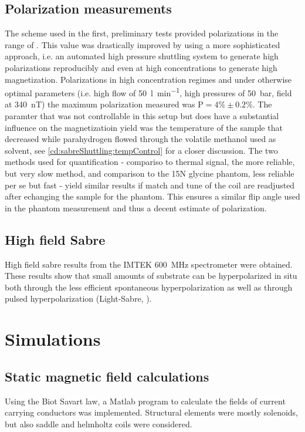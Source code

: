     \subsection{Polarization measurements}
        The scheme used in the first, preliminary tests provided polarizations in the range of . This value was drastically improved by using a more sophisticated approach, i.e. an automated high pressure shuttling system to generate high polarizations reproducibly and even at high concentrations to generate high magnetization.
        Polarizations in high concentration regimes and under otherwise optimal parameters (i.e. high flow of \SI{50}{\litre\per\minute}, high pressures of \SI{50}{\bar}, field at \SI{340}{\nano\tesla}) the maximum polarization measured was $\mathrm{P} = 4\% \pm 0.2 \%$. The paramter that was not controllable in this setup but does have a substantial influence on the magnetizatioin yield was the temperature of the sample that decreased while parahydrogen flowed through the volatile methanol used as solvent, see \ref{cd:sabreShuttling:tempControl} for a closer discussion.
        The two methods used for quantification - compariso to thermal signal, the more reliable, but very slow method, and comparison to the 15N glycine phantom, less reliable per se but fast - yield similar results if match and tune of the coil are readjusted after echanging the sample for the phantom. This ensures a similar flip angle used in the phantom measurement and thus a decent estimate of polarization.
    \subsection{High field Sabre}
        High field sabre results from the IMTEK \SI{600}{\mega\hertz} spectrometer were obtained. These results show that small amounts of substrate can be hyperpolarized in situ both through the less efficient spontaneous hyperpolarization as well as through pulsed hyperpolarization (Light-Sabre, ).
\section{Simulations}
        \label{sec:results:sim}
        \subsection{Static magnetic field calculations}
            Using the Biot Savart law, a Matlab program to calculate the fields of current carrying conductors was implemented. Structural elements were mostly solenoids, but also saddle and helmholtz coils were considered.
